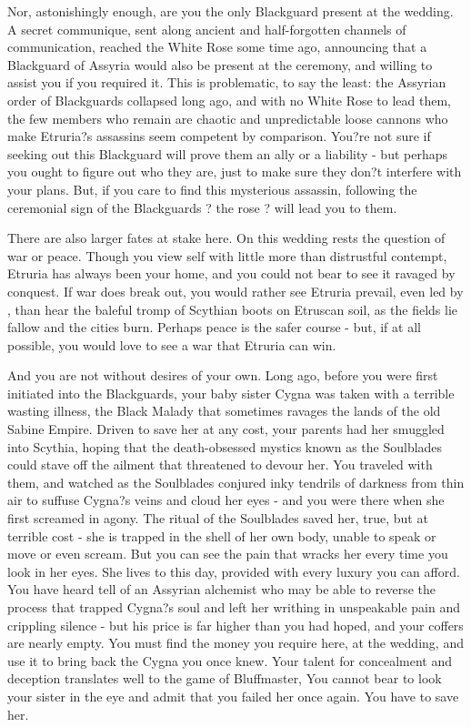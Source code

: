 \documentclass[char]{Kos}
\begin{document}
    Nor, astonishingly enough, are you the only Blackguard present at the wedding. A secret communique, sent along ancient and half-forgotten channels of communication, reached the White Rose some time ago, announcing that a Blackguard of Assyria would also be present at the ceremony, and willing to assist you if you required it. This is problematic, to say the least: the Assyrian order of Blackguards collapsed long ago, and with no White Rose to lead them, the few members who remain are chaotic and unpredictable loose cannons who make Etruria?s assassins seem competent by comparison. You?re not sure if seeking out this Blackguard will prove them an ally or a liability - but perhaps you ought to figure out who they are, just to make sure they don?t interfere with your plans. But, if you care to find this mysterious assassin, following the ceremonial sign of the Blackguards ? the rose ? will lead you to them.

    There are also larger fates at stake here. On this wedding rests the question of war or peace. Though you view \cEtruriaKing{\Monarch} \cEtruriaKing{} \cEtruriaKing{\them}self with little more than distrustful contempt, Etruria has always been your home, and you could not bear to see it ravaged by conquest. If war does break out, you would rather see Etruria prevail, even led by \cEtruriaKing{}, than hear the baleful tromp of Scythian boots on Etruscan soil, as the fields lie fallow and the cities burn. Perhaps peace is the safer course - but, if at all possible, you would love to see a war that Etruria can win. 

    And you are not without desires of your own. Long ago, before you were first initiated into the Blackguards, your baby sister Cygna was taken with a terrible wasting illness, the Black Malady that sometimes ravages the lands of the old Sabine Empire. Driven to save her at any cost, your parents had her smuggled into Scythia, hoping that the death-obsessed mystics known as the Soulblades could stave off the ailment that threatened to devour her. You traveled with them, and watched as the Soulblades conjured inky tendrils of darkness from thin air to suffuse Cygna?s veins and cloud her eyes - and you were there when she first screamed in agony. The ritual of the Soulblades saved her, true, but at terrible cost - she is trapped in the shell of her own body, unable to speak or move or even scream. But you can see the pain that wracks her every time you look in her eyes. She lives to this day, provided with every luxury you can afford. You have heard tell of an Assyrian alchemist who may be able to reverse the process that trapped Cygna?s soul and left her writhing in unspeakable pain and crippling silence - but his price is far higher than you had hoped, and your coffers are nearly empty. You must find the money you require here, at the wedding, and use it to bring back the Cygna you once knew. Your talent for concealment and deception translates well to the game of Bluffmaster, You cannot bear to look your sister in the eye and admit that you failed her once again. You have to save her.
\end{document}
